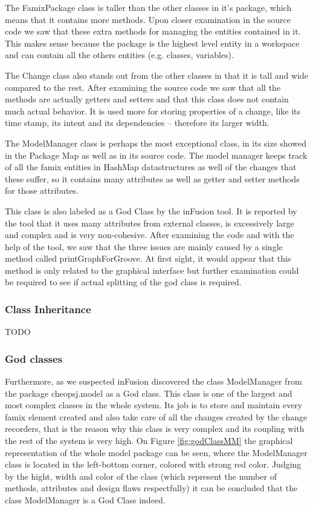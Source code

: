 \documentclass{article}
\begin{document}
The FamixPackage class is taller than the other classes in it's package, which means that it contains more methods. Upon closer examination in the source code we saw that these extra methods for managing the entities contained in it. This makes sense because the package is the highest level entity in a workspace and can contain all the others entities (e.g. classes, variables).

The Change class also stands out from the other classes in that it is tall and wide compared to the rest. After examining the source code we saw that all the methods are actually getters and setters and that this class does not contain much actual behavior. It is used more for storing properties of a change, like its time stamp, its intent and its dependencies -- therefore its larger width.

The ModelManager class is perhaps the most exceptional class, in its size showed in the Package Map as well as in its source code. The model manager keeps track of all the famix entities in HashMap datastructures as well of the changes that these suffer, so it contains many attributes as well as getter and setter methods for those attributes. 

This class is also labeled as a God Class by the inFusion tool. It is reported by the tool that it uses many attributes from external classes, is excessively large and complex and is very non-cohesive. After examining the code and with the help of the tool, we saw that the three issues are mainly caused by a single method called printGraphForGroove. At first sight, it would appear that this method is only related to the graphical interface but further examination could be required to see if actual splitting of the god class is required.

\subsubsection{Class Inheritance}
\label{sec:classInheritance}
TODO

\subsubsection{God classes}
Furthermore, as we suspected inFusion discovered the class ModelManager from the package cheopsj.model as a God class. This class is one of the largest and most complex classes in the whole system. Its job is to store and maintain every famix element created and also take care of all the changes created by the change recorders, that is the reason why this class is very complex and its coupling with the rest of the system is very high. On Figure \ref{fig:godClassMM} the graphical representation of the whole model package can be seen, where the ModelManager class is located in the left-bottom corner, colored with strong red color. Judging by the hight, width and color of the class (which represent the number of methods, attributes and design flaws respectfully) it can be concluded that the class ModelManager is a God Class indeed.
\end{document}
